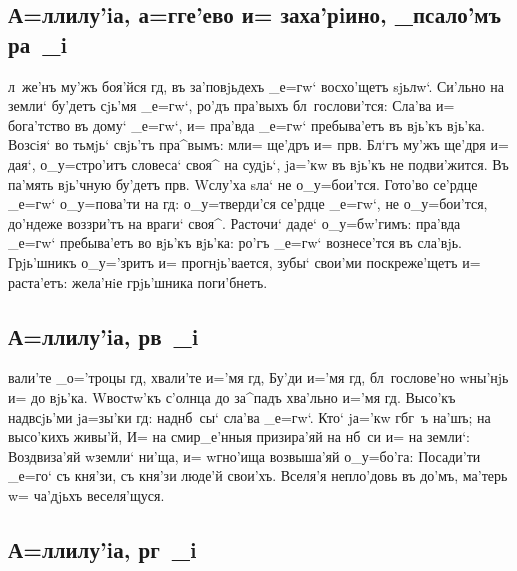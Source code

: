 \documentclass[12pt,a6paper,twoside,dvips,civil=antiqua,cs=izhitsa]{hipbook}
\begin{document}
\delimpict

\subsection{А=ллилу'iа, а=гге'ево и= заха'рiино, _псало'мъ ра~_i}

л~же'нъ му'жъ боя'йся гд, въ за'повjьдехъ _е=гw` восхо'щетъ
sjьлw`. Си'льно на земли` бу'детъ сjь'мя _е=гw`, ро'дъ пра'выхъ
бл~гослови'тся: Сла'ва и= бога'тство въ дому` _е=гw`, и= пра'вда _е=гw`
пребыва'етъ въ вjь'къ вjь'ка. Возсiя` во тьмjь` свjь'тъ пра^вымъ: мл и=
ще'дръ и= прв. Бл`гъ му'жъ ще'дря и= дая`, о_у=стро'итъ словеса` своя^ на
судjь`, jа='кw въ вjь'къ не подви'жится. Въ па'мять вjь'чную бу'детъ
прв. W\т слу'ха sла` не о_у=бои'тся. Гото'во се'рдце _е=гw` о_у=пова'ти
на гд: о_у=тверди'ся се'рдце _е=гw`, не о_у=бои'тся, до'ндеже воззри'тъ на
враги` своя^. Расточи` даде` о_у=бw'гимъ: пра'вда _е=гw` пребыва'етъ во вjь'къ
вjь'ка: ро'гъ _е=гw` вознесе'тся въ сла'вjь. Грjь'шникъ о_у='зритъ и=
прогнjь'вается, зубы` свои'ми поскреже'щетъ и= раста'етъ: жела'нiе грjь'шника
поги'бнетъ.

\slava

\delimpict

\subsection{А=ллилу'iа, рв~_i}

вали'те _о='троцы гд, хвали'те и='мя гд, Бу'ди и='мя гд,
бл~гослове'но w\т ны'нjь и= до вjь'ка. W\т востw'къ с'олнца до за^падъ
хва'льно и='мя гд. Высо'къ над\ъ всjь'ми jа=зы'ки гд: над\ъ нб~сы`
сла'ва _е=гw`. Кто` jа='кw г бг~ъ на'шъ; на высо'кихъ живы'й, И= на
смир_е'нныя призира'яй на нб~си и= на земли`: Воздвиза'яй w\т земли` ни'ща, и=
w\т гно'ища возвыша'яй о_у=бо'га: Посади'ти _е=го` съ кня'зи, съ кня'зи люде'й
свои'хъ. Вселя'я непло'довь въ до'мъ, ма'терь w= ча'дjьхъ веселя'щуся.

\delimpict

\subsection{А=ллилу'iа, рг~_i}
\end{document}
